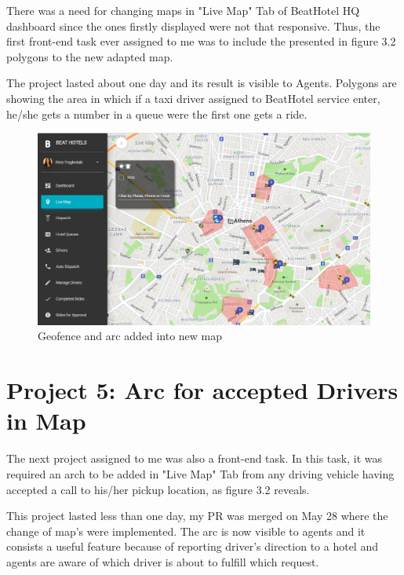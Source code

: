 There was a need for changing maps in "Live Map" Tab of BeatHotel HQ dashboard since the ones firstly displayed were not that responsive. Thus, the first front-end task ever assigned to me was to include the presented in figure 3.2 polygons to the new adapted map. \par

The project lasted about one day and its result is visible to Agents. Polygons are showing the area in which if a taxi driver assigned to BeatHotel service enter, he/she gets a number in a queue were the first one gets a ride. \par 

\begin{figure}[H]
	\begin{center}
		\includegraphics[scale=0.45]{images/my_projects/new_map.png}
	\end{center}
	\caption{Geofence and arc added into new map}
\end{figure}

\section{Project 5: Arc for accepted Drivers in Map}

The next project assigned to me was also a front-end task. In this task, it was required an arch to be added in "Live Map" Tab from any driving vehicle having accepted a call to his/her pickup location, as figure 3.2 reveals.\par

This project lasted less than one day, my PR was merged on May 28 where the change of map's were implemented. The arc is now visible to agents and it consists a useful feature because of reporting driver's direction to a hotel and agents are aware of which driver is about to fulfill which request. \par


